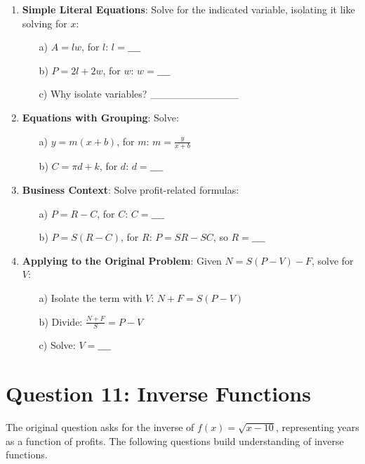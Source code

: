 \documentclass[12pt]{article}
\begin{document}
\begin{enumerate}[label=10.\arabic*]
    \item \textbf{Simple Literal Equations}: Solve for the indicated variable, isolating it like solving for \( x \):
    \begin{enumerate}
        \item[a)] \( A = lw \), for \( l \): \( l = \_\_\_\_ \)
        \item[b)] \( P = 2l + 2w \), for \( w \): \( w = \_\_\_\_ \)
        \item[c)] Why isolate variables? \_\_\_\_\_\_\_\_\_\_\_\_
    \end{enumerate}
    \item \textbf{Equations with Grouping}: Solve:
    \begin{enumerate}
        \item[a)] \( y = m(x + b) \), for \( m \): \( m = \frac{y}{x + b} \)
        \item[b)] \( C = \pi d + k \), for \( d \): \( d = \_\_\_\_ \)
    \end{enumerate}
    \item \textbf{Business Context}: Solve profit-related formulas:
    \begin{enumerate}
        \item[a)] \( P = R - C \), for \( C \): \( C = \_\_\_\_ \)
        \item[b)] \( P = S(R - C) \), for \( R \): \( P = S R - S C \), so \( R = \_\_\_\_ \)
    \end{enumerate}
    \item \textbf{Applying to the Original Problem}: Given \( N = S(P - V) - F \), solve for \( V \):
    \begin{enumerate}
        \item[a)] Isolate the term with \( V \): \( N + F = S(P - V) \)
        \item[b)] Divide: \( \frac{N + F}{S} = P - V \)
        \item[c)] Solve: \( V = \_\_\_\_ \)
    \end{enumerate}
\end{enumerate}

\section*{Question 11: Inverse Functions}
The original question asks for the inverse of \( f(x) = \sqrt{x - 10} \), representing years as a function of profits. The following questions build understanding of inverse functions.
\end{document}
